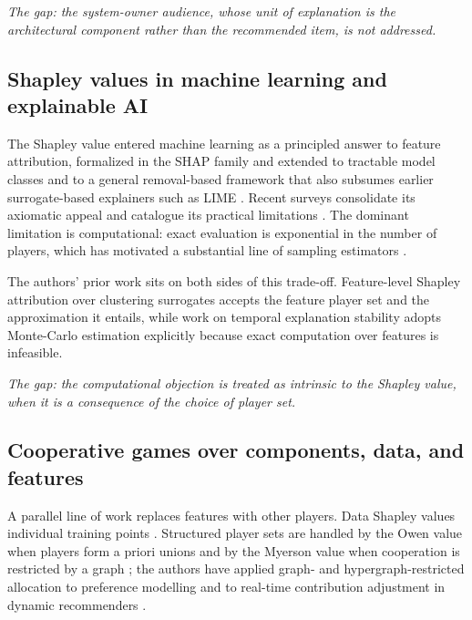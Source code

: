 \documentclass[pdflatex,sn-mathphys-num]{sn-jnl}%
\theoremstyle{thmstyleone}%
\theoremstyle{thmstyletwo}%
\theoremstyle{thmstylethree}%
\begin{document}
\emph{The gap: the system-owner audience, whose unit of explanation is the architectural component rather than the recommended item, is not addressed.}

\subsection{Shapley values in machine learning and explainable AI}\label{subsec2_3}

The Shapley value \cite{shapley1953} entered machine learning as a principled answer to feature attribution, formalized in the SHAP family \cite{lundberg2017} and extended to tractable model classes \cite{lundberg2020} and to a general removal-based framework \cite{covert2021} that also subsumes earlier surrogate-based explainers such as LIME \cite{ribeiro2016}. Recent surveys consolidate its axiomatic appeal and catalogue its practical limitations \cite{li2024shapley}. The dominant limitation is computational: exact evaluation is exponential in the number of players, which has motivated a substantial line of sampling estimators \cite{castro2009,strumbelj2010}.

The authors' prior work sits on both sides of this trade-off. Feature-level Shapley attribution over clustering surrogates \cite{louhichi2023,louhichi2025} accepts the feature player set and the approximation it entails, while work on temporal explanation stability \cite{nesmaoui2026drift} adopts Monte-Carlo estimation explicitly because exact computation over features is infeasible.

\emph{The gap: the computational objection is treated as intrinsic to the Shapley value, when it is a consequence of the choice of player set.}

\subsection{Cooperative games over components, data, and features}\label{subsec2_4}

A parallel line of work replaces features with other players. Data Shapley values individual training points \cite{ghorbani2019}. Structured player sets are handled by the Owen value when players form a priori unions \cite{owen1977} and by the Myerson value when cooperation is restricted by a graph \cite{myerson1977}; the authors have applied graph- and hypergraph-restricted allocation to preference modelling \cite{louhichi2026} and to real-time contribution adjustment in dynamic recommenders \cite{nesmaoui2025}.
\end{document}
